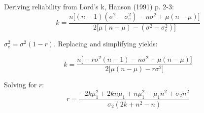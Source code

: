 \documentclass{article}
\begin{document}
Deriving reliability from Lord's k, Hanson (1991) p. 2-3:
\begin{equation}
	k = \frac{n\big[(n - 1)(\sigma^2 - \sigma_e^2) - n\sigma^2 + \mu(n - \mu)\big]}{2\big[\mu(n - \mu) - (\sigma^2 - \sigma_e^2)\big]}
\end{equation}

$\sigma_e^2 = \sigma^2(1 - r)$. Replacing and simplifying yields:

\begin{equation}
	k = \frac{n\big[-r\sigma^2(n - 1) - n\sigma^2 + \mu(n - \mu)\big]}{2\big[\mu(n - \mu) - r\sigma^2\big]}
\end{equation}

Solving for $r$:
\begin{equation}
	r = \frac{-2k\mu_1^2 + 2kn\mu_1 + n\mu_1^2 - \mu_1n^2 + \sigma_2n^2}{\sigma_2(2k + n^2 - n)}
\end{equation}
\end{document}

